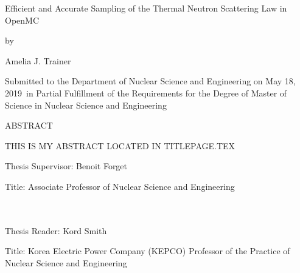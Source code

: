 \documentclass{article}
\newcommand{\thesis}{Efficient and Accurate Sampling of the Thermal Neutron Scattering Law in OpenMC}
\newcommand{\me}{Amelia J. Trainer}
\newcommand{\signDate}{May 18, 2019}
\newcommand{\advisorName}{Benoit Forget}
\newcommand{\advisorTitle}{Associate Professor of Nuclear Science and Engineering}
\newcommand{\readerName}{Kord Smith}
\newcommand{\readerTitle}{Korea Electric Power Company (KEPCO) Professor of the Practice of Nuclear Science and Engineering}
\newcommand{\abstractart}{   
    THIS IS MY ABSTRACT LOCATED IN TITLEPAGE.TEX
    }
\begin{document}
\newpage
\begin{titlepage}
\setcounter{page}{3} 
    \begin{center}
    {\large{\thesis}}
    
    \bigskip
    {by}
    
    \bigskip
    {\me}
    
    \bigskip
    {\parbox{3.7in}{\centering Submitted to the Department of Nuclear Science and Engineering on {\signDate}\ in Partial Fulfillment of the Requirements for the Degree of Master of Science in Nuclear Science and Engineering}}
    \end{center}
    \bigskip
    
    \begin{flushleft}
    ABSTRACT
    
    \bigskip
    \abstractart
    \vfill
    {Thesis Supervisor: \advisorName}
    
    {Title: \advisorTitle}

    ~\\~\\
    
    {Thesis Reader: \readerName}
    
    {Title: \readerTitle}
    \end{flushleft}
    
\end{titlepage}
\blankpage
\end{document}
